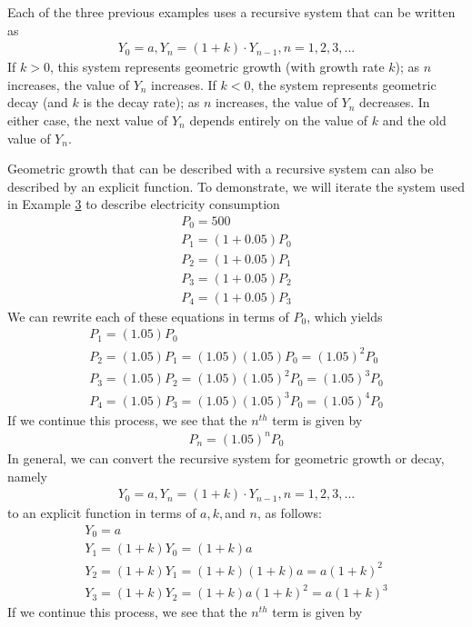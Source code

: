 \documentclass[10pt,]{book}
\theoremstyle{plain}
\theoremstyle{definition}
\theoremstyle{definition}
\theoremstyle{definition}
\numberwithin{equation}{section}
\newcommand{\lt}{<}
\newcommand{\gt}{>}
\begin{document}
Each of the three previous examples uses a recursive system that can be written as%
%
\begin{gather*}
Y_0=a,Y_n=(1+k) \cdot Y_{n-1}, n=1,2,3, ...
\end{gather*}
If \(k \gt 0\), this system represents geometric growth (with growth rate \(k\)); as \(n\) increases, the value of \(Y_n\)  increases.  If \(k \lt 0\), the system represents geometric decay (and \(k\) is the decay rate); as \(n\) increases, the value of \(Y_n\)  decreases.  In either case, the next value of \(Y_n\) depends entirely on the value of \(k\) and the old value of \(Y_n\).%
\par
Geometric growth that can be described with a recursive system can also be described by an explicit function.  To demonstrate, we will iterate the system used in Example \hyperref[example-radioactive-decay]{3} to describe electricity consumption%
%
\begin{gather*}
P_0=500\\
P_1=(1+0.05)P_0\\
P_2=(1+0.05)P_1\\
P_3=(1+0.05)P_2\\
P_4=(1+0.05)P_3
\end{gather*}
We can rewrite each of these equations in terms of \(P_0\), which yields%
%
\begin{gather*}
P_1=(1.05)P_0\\
P_2=(1.05) P_1=(1.05) (1.05)P_0=(1.05)^2 P_0\\
P_3=(1.05) P_2=(1.05) (1.05)^2 P_0=(1.05)^3 P_0\\
P_4=(1.05) P_3=(1.05) (1.05)^3 P_0=(1.05)^4 P_0
\end{gather*}
If we continue this process, we see that the \(n^{th}\) term is given by%
%
\begin{gather*}
P_n=(1.05)^n P_0
\end{gather*}
In general, we can convert the recursive system for geometric growth or decay, namely%
%
\begin{gather*}
Y_0=a,Y_n=(1+k) \cdot Y_{n-1}, n=1,2,3, ...
\end{gather*}
to an explicit function in terms of \(a, k, \)and \(n\), as follows:%
%
\begin{gather*}
Y_0=a\\
Y_1=(1+k)Y_0 = (1+k)a\\
Y_2=(1+k)Y_1 = (1+k)(1+k)a = a(1+k)^2\\
Y_3=(1+k)Y_2 = (1+k)a(1+k)^2 = a(1+k)^3
\end{gather*}
If we continue this process, we see that the \(n^{th}\) term is given by%
\end{document}

